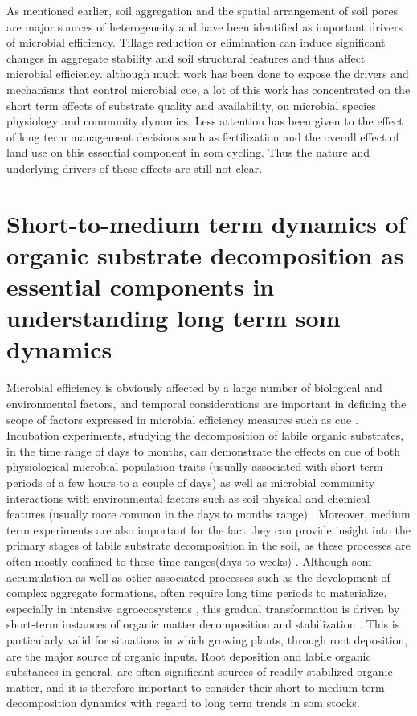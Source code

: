 		As mentioned earlier, soil aggregation and the spatial arrangement of soil pores are major sources of heterogeneity and have been identified as important drivers of microbial efficiency\citep{kravchenko2019}.
		Tillage reduction or elimination can induce significant changes in aggregate stability and soil structural features \citep{alvaro-fuentes2009, barreto2009} and thus affect microbial efficiency.
		although much work has been done to expose the drivers and mechanisms that control microbial \gls{cue}, a lot of this work has concentrated on the short term effects of substrate quality and availability, on microbial species physiology and community dynamics. Less attention has been given to the effect of long term management decisions such as fertilization and the overall effect of land use on this essential component in \gls{som} cycling. Thus the nature and underlying drivers of these effects are still not clear.

\section{Short-to-medium term dynamics of organic substrate decomposition as essential components in understanding long term \gls{som} dynamics}

		Microbial efficiency is obviously affected by a large number of biological and environmental factors, and temporal considerations are important in defining the scope of factors expressed in microbial efficiency measures such as \gls{cue} \citep{kallenbach2019}. Incubation experiments, studying the decomposition of labile organic substrates, in the time range of days to months,  can demonstrate the effects on \gls{cue} of both physiological microbial population traits (usually associated with short-term periods of a few hours to a couple of days) as well as microbial community interactions with environmental factors such as soil physical and chemical features (usually more common in the days to months range) \citep{geyer2016, manzoni2018}. Moreover, medium term experiments are also important for the fact they can provide insight into the primary stages of labile substrate decomposition in the soil, as these processes are often mostly confined to these time ranges(days to weeks) \citep{blagodatskaya2011, schneckenberger2008, tian2015}. Although \gls{som} accumulation as well as other associated processes such as the development of complex aggregate formations, often require long time periods to materialize, especially in intensive agroecosystems \citep{grandy2007}, this gradual transformation is driven by short-term instances of organic matter decomposition and stabilization \citep{kuzyakov2015}. This is particularly valid for situations in which growing plants, through root deposition, are the major source of organic inputs. Root deposition and labile organic substances in general, are often significant sources of readily stabilized organic matter, and it is therefore important to consider their short to medium term decomposition dynamics with regard to long term trends in \gls{som} stocks.

